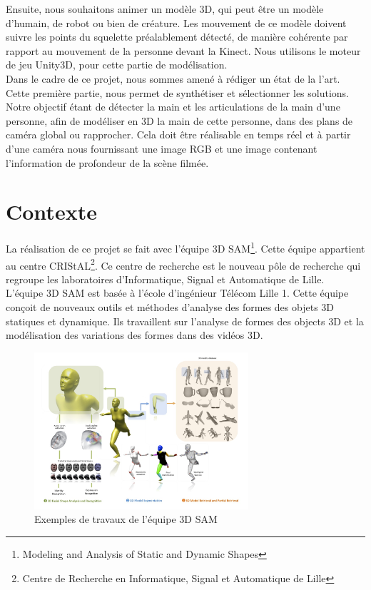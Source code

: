 Ensuite, nous souhaitons animer un modèle 3D, qui peut être un modèle 
d'humain, de robot ou bien de créature. Les mouvement de ce modèle 
doivent suivre les points du squelette préalablement détecté, de 
manière cohérente par rapport au mouvement de la personne devant la 
Kinect. Nous utilisons le moteur de jeu Unity3D, pour cette partie de 
modélisation.\\

Dans le cadre de ce projet, nous sommes amené à rédiger un état de la 
l'art. Cette première partie, nous permet de synthétiser et sélectionner 
les solutions. Notre objectif étant de détecter la main et les 
articulations de la main d'une personne, afin de modéliser en 3D la main 
de cette personne, dans des plans de caméra global ou rapprocher. Cela 
doit être réalisable en temps réel et à partir d'une caméra nous 
fournissant une image RGB et une image contenant l'information de 
profondeur de la scène filmée.\\

\section{Contexte}
La réalisation de ce projet se fait avec l'équipe 3D 
SAM\footnote{Modeling and Analysis of Static and Dynamic Shapes}. 
Cette équipe appartient au centre CRIStAL\footnote{Centre de Recherche 
en Informatique, Signal et Automatique de Lille}. Ce centre de 
recherche est le nouveau pôle de recherche qui regroupe les 
laboratoires d'Informatique, Signal et Automatique de Lille.\\


L'équipe 3D SAM est basée à l'école d'ingénieur Télécom Lille 1. 
Cette équipe conçoit de nouveaux outils et méthodes d'analyse des 
formes des objets 3D statiques et dynamique. Ils travaillent sur 
l'analyse de formes des objects 3D et la modélisation des variations 
des formes dans des vidéos 3D.

\begin{figure}[!h]
  \begin{center}
    \includegraphics[width=300px]{images/accueil-illus.jpg}
    \caption{Exemples de travaux de l'équipe 3D SAM}
  \end{center}
\end{figure}

